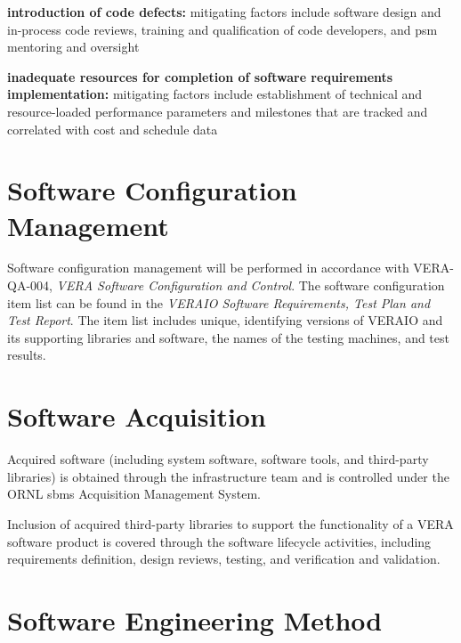 \documentclass{vera-ornltm}
\begin{document}
\begin{description}
\item \textbf{introduction of code defects:} mitigating factors include software design and in-process code reviews, training and qualification of code developers, and \ac{psm} mentoring and oversight
\item \textbf{inadequate resources for completion of software requirements implementation:} mitigating factors include establishment of technical and resource-loaded performance parameters and milestones that are tracked and correlated with cost and schedule data
\end{description}


\section{Software Configuration Management}
\label{sec:config}

Software configuration management will be performed in accordance with VERA-QA-004, {\it VERA Software Configuration and Control}.
The software configuration item list can be found in the \textit{VERAIO Software Requirements, Test Plan and Test Report}.
The item list includes unique, identifying versions of VERAIO and its supporting libraries and software, the names of the testing machines, and test results.


\section{Software Acquisition}

Acquired software (including system software, software tools, and third-party libraries) is obtained through the infrastructure team and is controlled under the ORNL \ac{sbms} Acquisition Management System.

Inclusion of acquired third-party libraries to support the functionality of a VERA software product is covered through the software lifecycle activities, including requirements definition, design reviews, testing, and verification and validation.


\section{Software Engineering Method}
\end{document}
